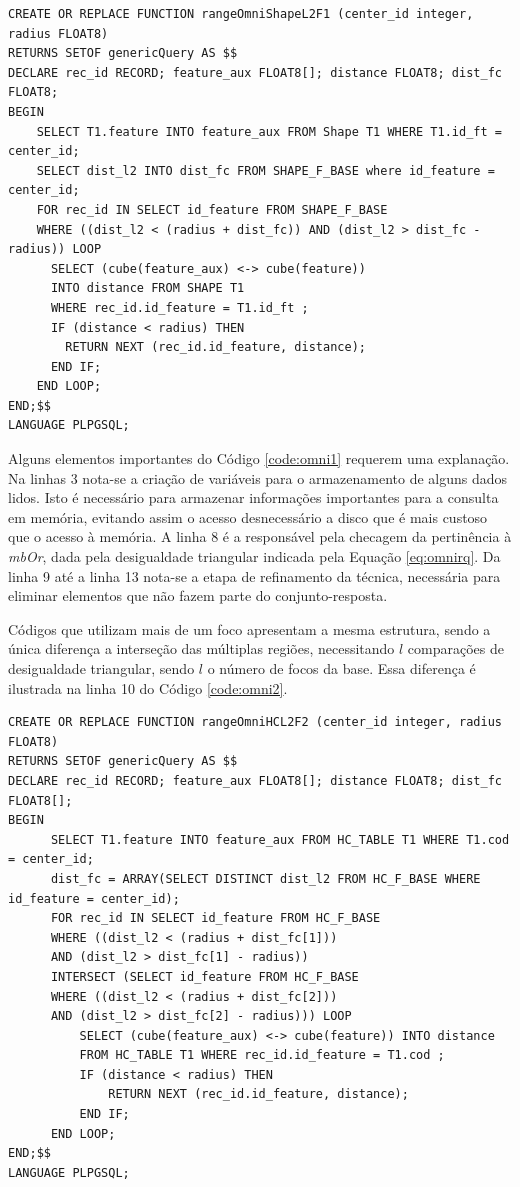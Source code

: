 \begin{lstlisting}[caption={rangeOmni utilizando 1 foco para a base cat\_dog}, captionpos=t, basicstyle=\tiny, label=code:omni1]
CREATE OR REPLACE FUNCTION rangeOmniShapeL2F1 (center_id integer, radius FLOAT8) 
RETURNS SETOF genericQuery AS $$
DECLARE rec_id RECORD; feature_aux FLOAT8[]; distance FLOAT8; dist_fc FLOAT8;
BEGIN
	SELECT T1.feature INTO feature_aux FROM Shape T1 WHERE T1.id_ft = center_id;
	SELECT dist_l2 INTO dist_fc FROM SHAPE_F_BASE where id_feature = center_id;	
	FOR rec_id IN SELECT id_feature FROM SHAPE_F_BASE 
	WHERE ((dist_l2 < (radius + dist_fc)) AND (dist_l2 > dist_fc - radius)) LOOP
	  SELECT (cube(feature_aux) <-> cube(feature)) 
	  INTO distance FROM SHAPE T1 
	  WHERE rec_id.id_feature = T1.id_ft ;
	  IF (distance < radius) THEN
	    RETURN NEXT (rec_id.id_feature, distance);			       
	  END IF;				
	END LOOP;
END;$$
LANGUAGE PLPGSQL;
\end{lstlisting}

Alguns elementos importantes do Código \ref{code:omni1} requerem uma explanação. Na linhas 3 nota-se a criação de variáveis para o armazenamento de alguns dados lidos. Isto é necessário para armazenar informações importantes
para a consulta em memória, evitando assim o acesso desnecessário a disco que é mais custoso que o acesso à memória. A linha 8 é a responsável pela checagem da pertinência à \textit{mbOr}, 
dada pela desigualdade triangular indicada pela Equação \ref{eq:omnirq}. Da linha 9 até a linha 13 nota-se a etapa de refinamento da técnica, necessária para eliminar elementos que não fazem parte do conjunto-resposta.

Códigos que utilizam mais de um foco apresentam a mesma estrutura, sendo a única diferença a interseção das múltiplas regiões, necessitando $l$ comparações de desigualdade triangular, sendo $l$ o número de focos da base. Essa diferença
é ilustrada na linha 10 do Código \ref{code:omni2}.
\begin{minipage}{\textwidth}
\begin{lstlisting}[caption={rangeOmni utilizando 2 focos para a base HC}, captionpos=t, basicstyle=\tiny, label=code:omni2]
CREATE OR REPLACE FUNCTION rangeOmniHCL2F2 (center_id integer, radius FLOAT8) 
RETURNS SETOF genericQuery AS $$
DECLARE rec_id RECORD; feature_aux FLOAT8[]; distance FLOAT8; dist_fc FLOAT8[];
BEGIN
      SELECT T1.feature INTO feature_aux FROM HC_TABLE T1 WHERE T1.cod = center_id;
      dist_fc = ARRAY(SELECT DISTINCT dist_l2 FROM HC_F_BASE WHERE id_feature = center_id); 
      FOR rec_id IN SELECT id_feature FROM HC_F_BASE 
      WHERE ((dist_l2 < (radius + dist_fc[1])) 
      AND (dist_l2 > dist_fc[1] - radius)) 
      INTERSECT (SELECT id_feature FROM HC_F_BASE 
      WHERE ((dist_l2 < (radius + dist_fc[2])) 
      AND (dist_l2 > dist_fc[2] - radius))) LOOP
	      SELECT (cube(feature_aux) <-> cube(feature)) INTO distance 
	      FROM HC_TABLE T1 WHERE rec_id.id_feature = T1.cod ;
	      IF (distance < radius) THEN
		      RETURN NEXT (rec_id.id_feature, distance);			       
	      END IF;				
      END LOOP; 
END;$$
LANGUAGE PLPGSQL;
\end{lstlisting}
\vspace{0.2cm}
\end{minipage}

